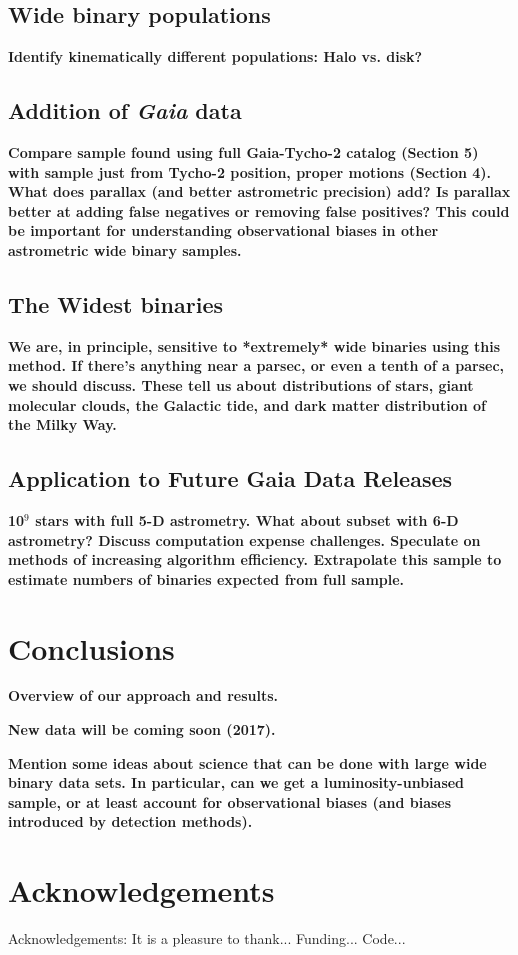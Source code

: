\documentclass[usenatbib]{mnras}
\begin{document}
\subsection{Wide binary populations}
{\bf Identify kinematically different populations: Halo vs. disk?}

\subsection{Addition of {\it Gaia} data}
{\bf Compare sample found using full Gaia-Tycho-2 catalog (Section 5) with sample just from Tycho-2 position, proper motions (Section 4).  What does parallax (and better astrometric precision) add? Is parallax better at adding false negatives or removing false positives? This could be important for understanding observational biases in other astrometric wide binary samples.}

\subsection{The Widest binaries}
{\bf We are, in principle, sensitive to *extremely* wide binaries using this method. If there's anything near a parsec, or even a tenth of a parsec, we should discuss. These tell us about distributions of stars, giant molecular clouds, the Galactic tide, and dark matter distribution of the Milky Way. }

\subsection{Application to Future Gaia Data Releases}
{\bf 10$^9$ stars with full 5-D astrometry. What about subset with 6-D astrometry? Discuss computation expense challenges. Speculate on methods of increasing algorithm efficiency. Extrapolate this sample to estimate numbers of binaries expected from full sample. } 





\section{Conclusions}

{\bf Overview of our approach and results.}

{\bf New data will be coming soon (2017).}

{\bf Mention some ideas about science that can be done with large wide binary data sets. In particular, can we get a luminosity-unbiased sample, or at least account for observational biases (and biases introduced by detection methods).}


\section*{Acknowledgements}
Acknowledgements:
It is a pleasure to thank...
Funding...
Code...





\label{lastpage}
\end{document}
